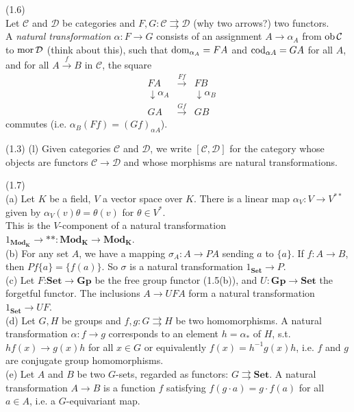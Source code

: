 \documentclass[a4paper]{article}
\begin{document}
\begin{defi} (1.6)\\
    Let $\mathcal{C}$ and $\mathcal{D}$ be categories and $F, G: \mathcal{C}\rightrightarrows \mathcal{D}$ (why two arrows?) two functors.\\
    A \emph{natural transformation} $\alpha:F \to G$ consists of an assignment $A \to \alpha_A$ from $\operatorname{ob} \mathcal{C}$ to $\operatorname{mor} \mathcal{D}$ (think about this), such that $\operatorname{dom}_{\alpha_A} = FA$ and $\operatorname{cod}_{\alpha A} = G A$ for all $A$, and for all $A \xrightarrow{f} B$ in $\mathcal{C}$, the square 
    \begin{equation*}
        \begin{aligned}
            &FA &\xrightarrow{Ff} &FB\\
            &\downarrow \alpha_A & &\downarrow \alpha_B\\
            &GA &\xrightarrow{Gf} & GB
        \end{aligned}
    \end{equation*}
    commutes (i.e. $\alpha_B(Ff) = (Gf)_{\alpha A}$).
\end{defi}

(1.3) (l) Given categories $\mathcal{C}$ and $\mathcal{D}$, we write $[\mathcal{C},\mathcal{D}]$ for the category whose objects are functors $\mathcal{C} \to \mathcal{D}$ and whose morphisms are natural transformations.

\begin{eg} (1.7)\\
    (a) Let $K$ be a field, $V$ a vector space over $K$. There is a linear map $\alpha_V : V \to V^{**}$ given by $\alpha_V (v) \theta = \theta(v)$ for $\theta \in V^*$.\\
    This is the $V$-component of a natural transformation $1_{\mathbf{Mod_K}} \to **: \mathbf{Mod_K} \to \mathbf{Mod_K}$.\\
    (b) For any set $A$, we have a mapping $\sigma_A:A \to PA$ sending $a$ to $\{a\}$. If $f:A \to B$, then $Pf\{a\} = \{f(a)\}$. So $\sigma$ is a natural transformation $1_{\mathbf{Set}} \to P$.\\
    (c) Let $F$:$\mathbf{Set} \to \mathbf{Gp}$ be the free group functor (1.5(b)), and $U: \mathbf{Gp} \to \mathbf{Set}$ the forgetful functor. The inclusions $A \to UFA$ form a natural transformation $1_{\mathbf{Set}} \to UF$.\\
    (d) Let $G,H$ be groups and $f,g: G \rightrightarrows H$ be two homomorphisms. A natural transformation $\alpha: f \to g$ corresponds to an element $h=\alpha_*$ of $H$, s.t. $h f(x) \to g(x) h$ for all $x \in G$ or equivalently $f(x) = h^{-1} g(x) h$, i.e. $f$ and $g$ are conjugate group homomorphisms.\\
    (e) Let $A$ and $B$ be two $G$-sets, regarded as functors: $G \rightrightarrows \mathbf{Set}$. A natural transformation $A \to B$ is a function $f$ satisfying $f(g\cdot a) = g \cdot f(a)$ for all $a \in A$, i.e. a $G$-equivariant map.
\end{eg}
\end{document}
